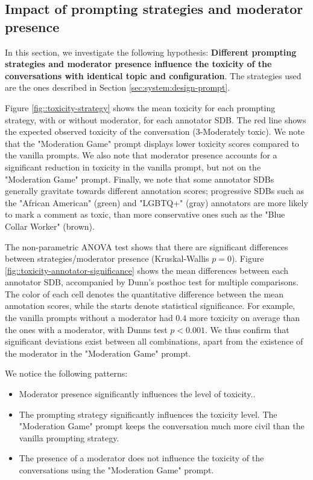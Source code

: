 \subsection{Impact of prompting strategies and moderator presence}
\label{ssec:evaluation:users}

In this section, we investigate the following hypothesis: \textbf{Different prompting strategies and moderator presence influence the toxicity of the conversations with identical topic and configuration}. The strategies used are the ones described in Section \ref{sec:system:design-prompt}.

Figure \ref{fig::toxicity-strategy} shows the mean toxicity for each prompting strategy, with or without moderator, for each annotator \ac{SDB}. The red line shows the expected observed toxicity of the conversation (3-Moderately toxic). We note that the "Moderation Game" prompt displays lower toxicity scores compared to the vanilla prompts. We also note that moderator presence accounts for a significant reduction in toxicity in the vanilla prompt, but not on the "Moderation Game" prompt. Finally, we note that some annotator \acp{SDB} generally gravitate towards different annotation scores; progressive \acp{SDB} such as the "African American" (green) and "LGBTQ+" (gray) annotators are more likely to mark a comment as toxic, than more conservative ones such as the "Blue Collar Worker" (brown).

The non-parametric ANOVA test shows that there are significant differences between strategies/moderator presence (Kruskal-Wallis $p=0$). Figure \ref{fig::toxicity-annotator-significance} shows the mean differences between each annotator \ac{SDB}, accompanied by Dunn's posthoc test for multiple comparisons. The color of each cell denotes the quantitative difference between the mean annotation scores, while the starts denote statistical significance. For example, the vanilla prompts without a moderator had $0.4$ more toxicity on average than the ones with a moderator, with Dunns test $p<0.001$. We thus confirm that significant deviations exist between all combinations, apart from the existence of the moderator in the "Moderation Game" prompt.

We notice the following patterns:

\begin{itemize}
	\item Moderator presence significantly influences the level of toxicity..
	
	\item The prompting strategy significantly influences the toxicity level. The "Moderation Game" prompt keeps the conversation much more civil than the vanilla prompting strategy.
	
	\item The presence of a moderator does not influence the toxicity of the conversations using the "Moderation Game" prompt.
\end{itemize}

